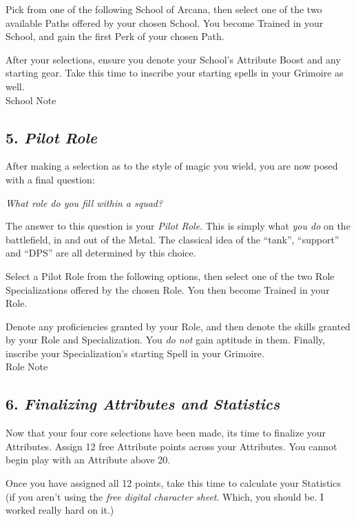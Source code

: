\documentclass[
]{article}
\begin{document}
Pick from one of the following School of Arcana, then select one of the
two available Paths offered by your chosen School. You become Trained in
your School, and gain the first Perk of your chosen Path.

After your selections, ensure you denote your School's Attribute Boost
and any starting gear. Take this time to inscribe your starting spells
in your Grimoire as well.\\
{School Note}

\hypertarget{pilot-role}{%
\subsection{\texorpdfstring{5. \emph{Pilot
Role}}{5. Pilot Role}}\label{pilot-role}}

After making a selection as to the style of magic you wield, you are now
posed with a final question:

\emph{What role do you fill within a squad?}

The answer to this question is your \emph{Pilot Role}. This is simply
what \emph{you do} on the battlefield, in and out of the Metal. The
classical idea of the ``tank'', ``support'' and ``DPS'' are all
determined by this choice.

Select a Pilot Role from the following options, then select one of the
two Role Specializations offered by the chosen Role. You then become
Trained in your Role.

Denote any proficiencies granted by your Role, and then denote the
skills granted by your Role and Specialization. You \emph{do not} gain
aptitude in them. Finally, inscribe your Specialization's starting Spell
in your Grimoire.\\
{Role Note}

\hypertarget{finalizing-attributes-and-statistics}{%
\subsection{\texorpdfstring{6. \emph{Finalizing Attributes and
Statistics}}{6. Finalizing Attributes and Statistics}}\label{finalizing-attributes-and-statistics}}

Now that your four core selections have been made, its time to finalize
your Attributes. Assign 12 free Attribute points across your Attributes.
You cannot begin play with an Attribute above 20.

Once you have assigned all 12 points, take this time to calculate your
Statistics (if you aren't using the \emph{free digital character sheet}.
Which, you should be. I worked really hard on it.)
\end{document}

